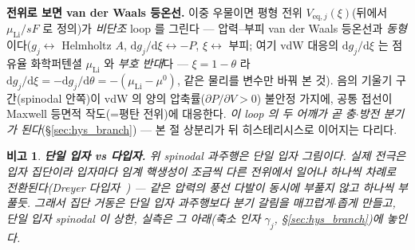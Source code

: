 \documentclass[11pt,a4paper]{article}
\newtheorem*{flagbox}{비고}
\newcommand{\dd}{\mathrm{d}}
\newcommand{\eq}{\mathrm{eq}}
\begin{document}
\textbf{전위로 보면 van der Waals 등온선.} 이중 우물이면 평형 전위 $V_{\eq,j}(\xi)$(뒤에서 $\mu_\mathrm{Li}/sF$ 로
정의)가 \emph{비단조} loop 를 그린다 — 압력--부피 van der Waals 등온선과 \emph{동형}이다($g_j\leftrightarrow$ Helmholtz
$A$, $\dd g_j/\dd\xi\leftrightarrow-P$, $\xi\leftrightarrow$ 부피; 여기 vdW 대응의 $\dd g_j/\dd\xi$ 는 점유율
화학퍼텐셜 $\mu_\mathrm{Li}$ 와 \emph{부호 반대}다 — $\xi=1-\theta$ 라 $\dd g_j/\dd\xi=-\dd g_j/\dd\theta=-(\mu_\mathrm{Li}-\mu^0)$,
같은 물리를 변수만 바꿔 본 것). 음의 기울기 구간(spinodal 안쪽)이 vdW 의 양의
압축률($\partial P/\partial V>0$) 불안정 가지에, 공통 접선이 Maxwell 등면적 작도(=평탄 전위)에 대응한다.
\emph{이 loop 의 두 어깨가 곧 충$\cdot$방전 분기가 된다}(\S\ref{sec:hys_branch}) — 본 절 상분리가 뒤 히스테리시스로
이어지는 다리다.
\begin{flagbox}
\textbf{단일 입자 vs 다입자.} 위 spinodal 과주행은 \emph{단일 입자} 그림이다. 실제 전극은 입자 집단이라 입자마다
임계 핵생성이 조금씩 다른 전위에서 일어나 \emph{하나씩 차례로} 전환된다(Dreyer 다입자~\cite{dreyer2010}) —
같은 압력의 풍선 다발이 동시에 부풀지 않고 하나씩 부풀듯. 그래서 집단 거동은 단일 입자 과주행보다 분기 갈림을
\emph{매끄럽게$\cdot$좁게} 만들고, 단일 입자 spinodal 이 \emph{상한}, 실측은 그 아래(축소 인자 $\gamma_j$,
\S\ref{sec:hys_branch})에 놓인다.
\end{flagbox}
\end{document}
